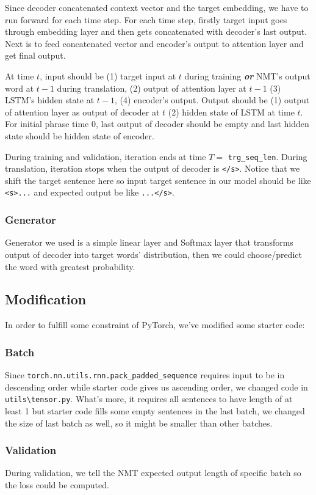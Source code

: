 \documentclass[11pt]{article}
\begin{document}
Since decoder concatenated context vector and the target embedding, we have to run forward for each time step. For each time step, firstly target input goes through embedding layer and then gets concatenated with decoder's last output. Next is to feed concatenated vector and encoder's output to attention layer and get final output.

At time $t$, input should be (1) target input at $t$ during training \textbf{\emph{or}} NMT's output word at $t -1$ during translation, (2) output of attention layer at $t - 1$ (3) LSTM's hidden state at $t-1$, (4) encoder's output. Output should be (1) output of attention layer as output of decoder at $t$ (2) hidden state of LSTM at time $t$. For initial phrase time 0, last output of decoder should be empty and last hidden state should be hidden state of encoder.

During training and validation, iteration ends at time $T = $ \texttt{trg\_seq\_len}. During translation, iteration stops when the output of decoder is \texttt{</s>}. Notice that we shift the target sentence here so input target sentence in our model should be like \texttt{<s>...} and expected output be like \texttt{...</s>}.
\subsubsection{Generator}
Generator we used is a simple linear layer and Softmax layer that transforms output of decoder into target words' distribution, then we could choose/predict the word with greatest probability. 
\subsection{Modification}
In order to fulfill some constraint of PyTorch, we've modified some starter code:
\subsubsection{Batch}
Since \texttt{torch.nn.utils.rnn.pack\_padded\_sequence} requires input to be in descending order while starter code gives us ascending order, we changed code in \texttt{utils\textbackslash tensor.py}. What's more, it requires all sentences to have length of at least 1 but starter code fills some empty sentences in the last batch, we changed the size of last batch as well, so it might be smaller than other batches.
\subsubsection{Validation}
During validation, we tell the NMT expected output length of specific batch so the loss could be computed.
\end{document}
